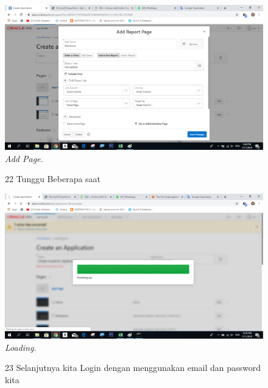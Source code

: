 \begin{enumerate}
\begin{figure}
    \begin{center}
    \includegraphics[scale=0.4]{figures/25.png}
    \caption{\textit{Add Page.}}
    \end{center}
    \label{gambar}
    \end{figure}    

\begin{figure}
\item[22]Tunggu Beberapa saat

    \begin{center}
    \includegraphics[scale=0.4]{figures/26.png}
    \caption{\textit{Loading.}}
    \end{center}
    \label{gambar}
    \end{figure}   

\begin{figure}
\item[23]Selanjutnya kita Login dengan menggunakan email dan password kita


\end{figure}
\end{enumerate}
